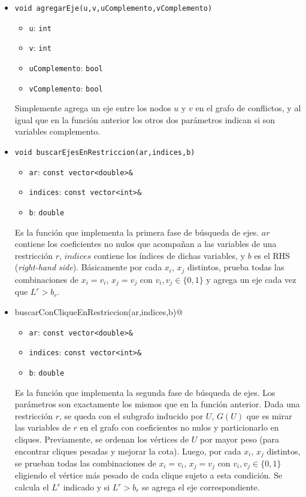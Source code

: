 \begin{itemize}
\item \verb_void agregarEje(u,v,uComplemento,vComplemento)_
	\begin{itemize}
	\item \verb_u_: \verb_int_
	\item \verb_v_: \verb_int_
	\item \verb_uComplemento_: \verb_bool_
	\item \verb_vComplemento_: \verb_bool_
	\end{itemize}
Simplemente agrega un eje entre los nodos $u$ y $v$ en el grafo de conflictos, y al igual que en la funci\'on anterior los otros dos par\'ametros indican si son variables complemento.

\item \verb_void buscarEjesEnRestriccion(ar,indices,b)_
	\begin{itemize}
	\item \verb_ar_: \verb_const vector<double>&_
	\item \verb_indices_: \verb_const vector<int>&_
	\item \verb_b_: \verb_double_
	\end{itemize}
Es la funci\'on que implementa la primera fase de b\'usqueda de ejes. $ar$ contiene los coeficientes no nulos que acompañan a las variables de una restricci\'on $r$, $indices$ contiene los \'indices de dichas variables, y $b$ es el RHS (\emph{right-hand side}). B\'asicamente por cada $x_i$, $x_j$ distintos, prueba todas las combinaciones de $x_i = v_i$, $x_j = v_j$ con $v_i,v_j\in \{0,1\}$ y agrega un eje cada vez que $L^r > b_r$.

\item \verb@void buscarConCliqueEnRestriccion(ar,indices,b)@ 
	\begin{itemize}
	\item \verb_ar_: \verb_const vector<double>&_
	\item \verb_indices_: \verb_const vector<int>&_
	\item \verb_b_: \verb_double_
	\end{itemize}
Es la funci\'on que implementa la segunda fase de b\'usqueda de ejes. Los par\'ametros son exactamente los mismos que en la funci\'on anterior. Dada una restricci\'on $r$, se queda con el subgrafo inducido por $U$, $G(U)$ que es mirar las variables de $r$ en el grafo con coeficientes no nulos y particionarlo en cliques. Previamente, se ordenan los v\'ertices de $U$ por mayor peso (para encontrar cliques pesadas y mejorar la cota). Luego, por cada $x_i$, $x_j$ distintos, se prueban todas las combinaciones de $x_i = v_i$, $x_j = v_j$ con $v_i,v_j\in \{0,1\}$ eligiendo el v\'ertice m\'as pesado de cada clique sujeto a esta condici\'on. Se calcula el $L^r$ indicado y si $L^r > b_r$ se agrega el eje correspondiente.


\end{itemize}
